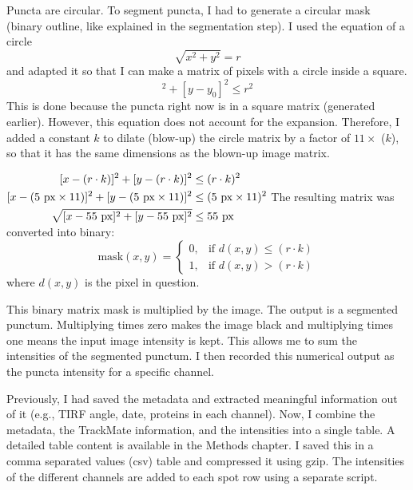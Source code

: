 Puncta are circular. To segment puncta, I had to generate a circular mask (binary outline, like explained in the segmentation step). I used the equation of a circle \begin{equation}\sqrt{x^2 + y^2} = r\end{equation} and adapted it so that I can make a matrix of pixels with a circle inside a square. \begin{equation}[x - x_0]^2 + [y - y_0]^2 \le r^2\end{equation} This is done because the puncta right now is in a square matrix (generated earlier). However, this equation does not account for the expansion. Therefore, I added a constant $k$ to dilate (blow-up) the circle matrix by a factor of $11\times$ ($k$), so that it has the same dimensions as the blown-up image matrix.

$\begin{aligned}
\relax[x - (r \cdot k)]^2 + [y - (r \cdot k)]^2 &\le (r \cdot k)^2\\
[x - (5\text{ px} \times 11)]^2 + [y - (5\text{ px} \times 11)]^2 &\le (5\text{ px} \times 11)^2 \\
\sqrt{[x - 55\text{ px}]^2 + [y - 55\text{ px}]^2} &\le 55\text{ px}
\end{aligned}$
The resulting matrix was converted into binary:
\begin{equation}
\text{mask}(x,y) =
\left\{\begin{array}{lr}
0, & \text{if }d(x,y)\le (r\cdot k)\\
1, & \text{if }d(x,y) > (r\cdot k)
\end{array}\right.
\end{equation}
where $d(x,y)$ is the pixel in question.

This binary matrix mask is multiplied by the image. The output is a segmented punctum. Multiplying times zero makes the image black and multiplying times one means the input image intensity is kept. This allows me to sum the intensities of the segmented punctum. I then recorded this numerical output as the puncta intensity for a specific channel.

Previously, I had saved the metadata and extracted meaningful information out of it (e.g., TIRF angle, date, proteins in each channel). Now, I combine the metadata, the TrackMate information, and the intensities into a single table. A detailed table content is available in the Methods chapter. I saved this in a comma separated values (csv) table and compressed it using gzip. The intensities of the different channels are added to each spot row using a separate script.

